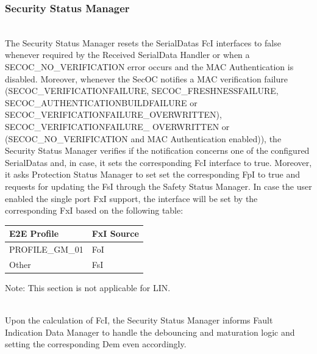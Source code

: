 \subsubsection{Security Status Manager}
\\
\label{sec:SecurityStatusDynamic}
The Security Status Manager resets the SerialDatas FcI interfaces to false whenever required by the Received SerialData Handler
or when a SECOC_NO_VERIFICATION error occurs and the MAC Authentication is disabled.
Moreover, whenever the SecOC notifies a MAC verification failure (SECOC_VERIFICATIONFAILURE, SECOC_FRESHNESSFAILURE, SECOC_AUTHENTICATIONBUILDFAILURE or SECOC_VERIFICATIONFAILURE_OVERWRITTEN),
SECOC_VERIFICATIONFAILURE_ OVERWRITTEN or (SECOC_NO_VERIFICATION and MAC Authentication enabled)),  
the Security Status Manager verifies if the notification concerns one of the configured SerialDatas and, 
in case, it sets the corresponding FcI interface to true.
Moreover, it asks Protection Status Manager to set set the corresponding FpI to true and requests for updating the FsI through the Safety Status Manager.
In case the user enabled the single port FxI support, the interface will be set by the corresponding FxI based on the following table:

\begin{table}[H]
    \begin{tabular}{|l|l|}
    \hline
    \textbf{E2E Profile} &  \textbf{FxI Source}\\ \hline
    PROFILE_GM_01                  & FoI \\ \hline
    Other                          & FsI \\ \hline
    \end{tabular}
\end{table}

Note: This section is not applicable for LIN.

{     }


\\
Upon the calculation of FcI, the Security Status Manager informs Fault Indication Data Manager 
to handle the debouncing and maturation logic and setting the corresponding Dem even accordingly.

{    }


